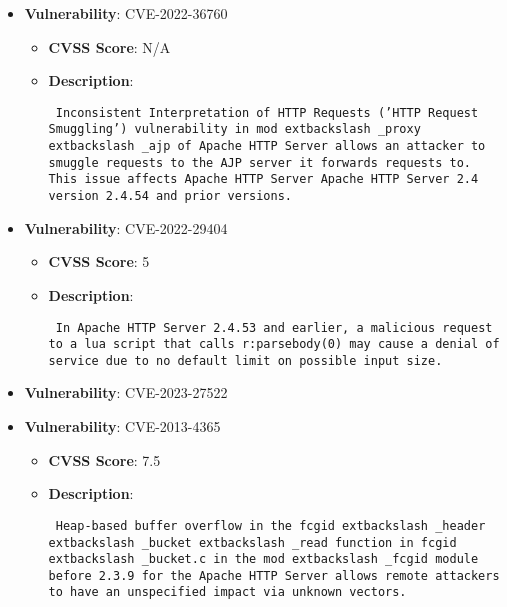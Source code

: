 \documentclass{article}
\begin{document}
\begin{itemize}
\begin{itemize}
{{ }}
        \end{itemize}
    
        \item \textbf{Vulnerability}: CVE-2022-36760
        \begin{itemize}
            \item \textbf{CVSS Score}:  N/A 
            \item \textbf{Description}: \parbox{\linewidth}{\texttt{ Inconsistent Interpretation of HTTP Requests ('HTTP Request Smuggling') vulnerability in mod	extbackslash _proxy	extbackslash _ajp of Apache HTTP Server allows an attacker to smuggle requests to the AJP server it forwards requests to.  This issue affects Apache HTTP Server Apache HTTP Server 2.4 version 2.4.54 and prior versions. }}
        \end{itemize}
    
        \item \textbf{Vulnerability}: CVE-2022-29404
        \begin{itemize}
            \item \textbf{CVSS Score}:  5 
            \item \textbf{Description}: \parbox{\linewidth}{\texttt{ In Apache HTTP Server 2.4.53 and earlier, a malicious request to a lua script that calls r:parsebody(0) may cause a denial of service due to no default limit on possible input size. }}
        \end{itemize}
    
        \item \textbf{Vulnerability}: CVE-2023-27522
    
        \item \textbf{Vulnerability}: CVE-2013-4365
        \begin{itemize}
            \item \textbf{CVSS Score}:  7.5 
            \item \textbf{Description}: \parbox{\linewidth}{\texttt{ Heap-based buffer overflow in the fcgid	extbackslash _header	extbackslash _bucket	extbackslash _read function in fcgid	extbackslash _bucket.c in the mod	extbackslash _fcgid module before 2.3.9 for the Apache HTTP Server allows remote attackers to have an unspecified impact via unknown vectors. }}
        \end{itemize}
    

\end{itemize}
\end{document}
